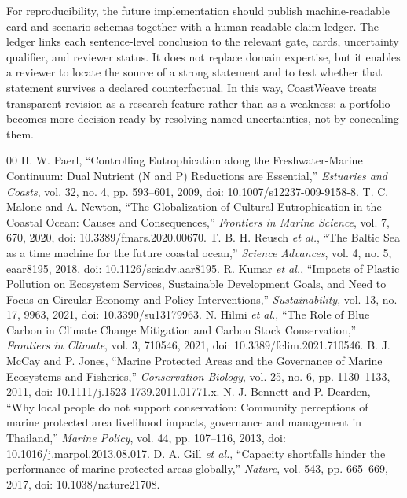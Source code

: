 \documentclass[conference]{IEEEtran}
\begin{document}
For reproducibility, the future implementation should publish machine-readable card and scenario schemas together with a human-readable claim ledger. The ledger links each sentence-level conclusion to the relevant gate, cards, uncertainty qualifier, and reviewer status. It does not replace domain expertise, but it enables a reviewer to locate the source of a strong statement and to test whether that statement survives a declared counterfactual. In this way, CoastWeave treats transparent revision as a research feature rather than as a weakness: a portfolio becomes more decision-ready by resolving named uncertainties, not by concealing them.

\begin{thebibliography}{00}
 H. W. Paerl, ``Controlling Eutrophication along the Freshwater-Marine Continuum: Dual Nutrient (N and P) Reductions are Essential,'' \emph{Estuaries and Coasts}, vol. 32, no. 4, pp. 593--601, 2009, doi: 10.1007/s12237-009-9158-8.
 T. C. Malone and A. Newton, ``The Globalization of Cultural Eutrophication in the Coastal Ocean: Causes and Consequences,'' \emph{Frontiers in Marine Science}, vol. 7, 670, 2020, doi: 10.3389/fmars.2020.00670.
 T. B. H. Reusch \emph{et al.}, ``The Baltic Sea as a time machine for the future coastal ocean,'' \emph{Science Advances}, vol. 4, no. 5, eaar8195, 2018, doi: 10.1126/sciadv.aar8195.
 R. Kumar \emph{et al.}, ``Impacts of Plastic Pollution on Ecosystem Services, Sustainable Development Goals, and Need to Focus on Circular Economy and Policy Interventions,'' \emph{Sustainability}, vol. 13, no. 17, 9963, 2021, doi: 10.3390/su13179963.
 N. Hilmi \emph{et al.}, ``The Role of Blue Carbon in Climate Change Mitigation and Carbon Stock Conservation,'' \emph{Frontiers in Climate}, vol. 3, 710546, 2021, doi: 10.3389/fclim.2021.710546.
 B. J. McCay and P. Jones, ``Marine Protected Areas and the Governance of Marine Ecosystems and Fisheries,'' \emph{Conservation Biology}, vol. 25, no. 6, pp. 1130--1133, 2011, doi: 10.1111/j.1523-1739.2011.01771.x.
 N. J. Bennett and P. Dearden, ``Why local people do not support conservation: Community perceptions of marine protected area livelihood impacts, governance and management in Thailand,'' \emph{Marine Policy}, vol. 44, pp. 107--116, 2013, doi: 10.1016/j.marpol.2013.08.017.
 D. A. Gill \emph{et al.}, ``Capacity shortfalls hinder the performance of marine protected areas globally,'' \emph{Nature}, vol. 543, pp. 665--669, 2017, doi: 10.1038/nature21708.

\end{thebibliography}
\end{document}

